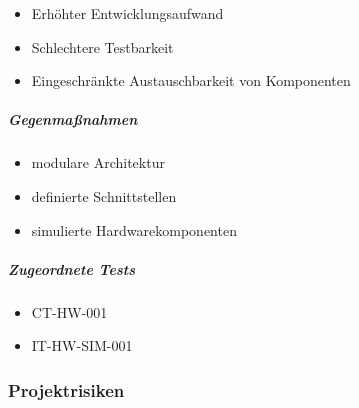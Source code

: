 \begin{itemize}
\tightlist
\item
  Erhöhter Entwicklungsaufwand
\item
  Schlechtere Testbarkeit
\item
  Eingeschränkte Austauschbarkeit von Komponenten
\end{itemize}

\subparagraph{Gegenmaßnahmen}\label{gegenmauxdfnahmen-3}

\begin{itemize}
\tightlist
\item
  modulare Architektur
\item
  definierte Schnittstellen
\item
  simulierte Hardwarekomponenten
\end{itemize}

\subparagraph{Zugeordnete Tests}\label{zugeordnete-tests-3}

\begin{itemize}
\tightlist
\item
  CT-HW-001
\item
  IT-HW-SIM-001
\end{itemize}

\subsubsection{Projektrisiken}\label{projektrisiken}

